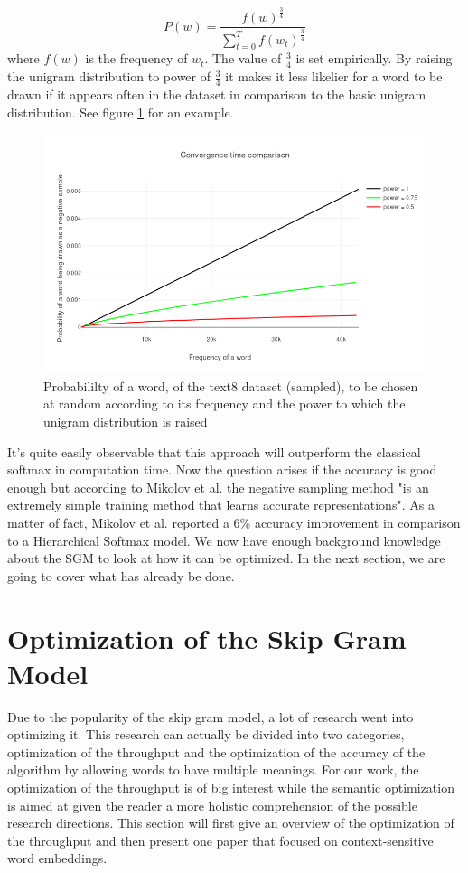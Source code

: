  \begin{equation} \label{eq:unigram}
P(w)=\frac{f(w)^{\frac{3}{4}}}{\sum_{t=0}^{T} f(w_t)^{\frac{3}{4}}}
\end{equation}
where $f(w)$ is the frequency of $w_t$. The value of $\frac{3}{4}$ is set empirically. By raising the unigram distribution to power of $\frac{3}{4}$ it makes it less likelier for a word to be drawn if it appears often in the dataset in comparison to the basic unigram distribution.  See figure \ref{fig:frequency_ex} for an example.
\begin{figure}[ht]
    \centering
            \includegraphics[scale=0.45]{images/frequency_ex} 
    \caption{Probabililty of a word, of the text8 dataset (sampled),  to be chosen at random according to its frequency and the power to which the unigram distribution is raised}
    \label{fig:frequency_ex}
\end{figure}
It's quite easily observable that this approach will outperform the classical softmax in computation time. Now the question arises if the accuracy is good enough but according to Mikolov et al. \cite{mikolov2} the negative sampling method "is an extremely simple training method that learns accurate representations". As a matter of fact, Mikolov et al. \cite{mikolov2} reported a 6\% accuracy improvement in comparison to a Hierarchical Softmax model.
We now have enough background knowledge about the SGM to look at how it can be optimized. In the next section, we are going to cover what has already be done.

\section{Optimization of the Skip Gram Model}
Due to the popularity of the skip gram model, a lot of research went into optimizing it. This research can actually be divided into two categories, optimization of the throughput and the optimization of the accuracy of the algorithm by allowing words to have multiple meanings. For our work, the optimization of the throughput is of big interest while the semantic optimization is aimed at given the reader a more holistic comprehension of the possible research directions. 
This section will first give an overview of the optimization of the throughput and then present one paper that focused on context-sensitive word embeddings. 

